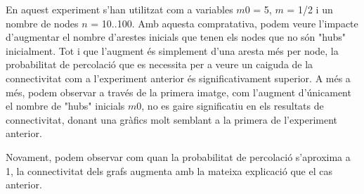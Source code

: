 \documentclass[a4paper]{article}
\begin{document}
	En aquest experiment s'han utilitzat com a variables $m0$ = 5, $m$ = 1/2 i un nombre de nodes $n$ = 10..100. Amb aquesta compratativa, podem veure l'impacte d'augmentar el nombre d'arestes inicials que tenen els nodes que no són "hubs" inicialment. Tot i que l'augment és simplement d'una aresta més per node, la probabilitat de percolació que es necessita per a veure un caiguda de la connectivitat
	com a l'experiment anterior és significativament superior. A més a més, podem observar a través de la primera imatge, com l'augment d'únicament el nombre de "hubs" inicials $m0$, no es gaire significatiu en els resultats de connectivitat, donant una gràfics molt semblant a la primera de l'experiment anterior.

	Novament, podem observar com quan la probabilitat de percolació s'aproxima a 1, la connectivitat dels grafs augmenta amb la mateixa explicació que el cas anterior.
\end{document}
